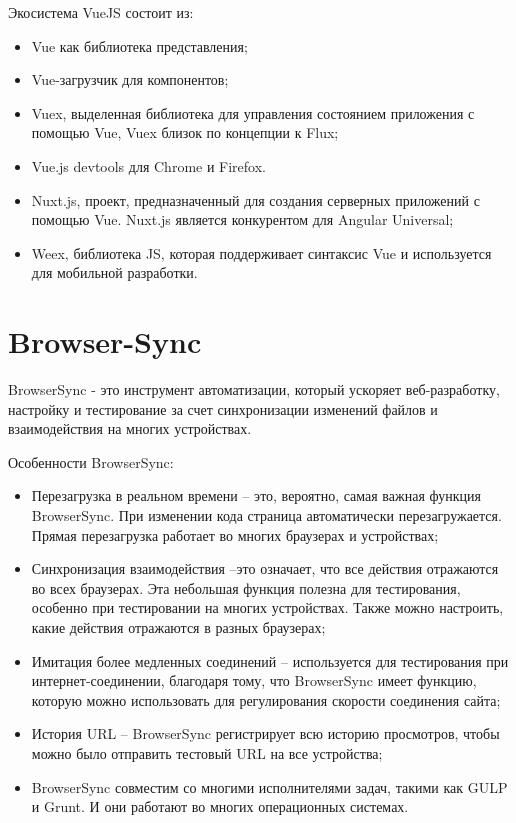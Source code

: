 Экосистема VueJS состоит из:

\begin{itemize}
	\item Vue как библиотека представления;
	\item Vue-загрузчик для компонентов;
	\item Vuex, выделенная библиотека для управления состоянием приложения с помощью Vue, Vuex близок по концепции к Flux;
	\item Vue.js devtools для Chrome и Firefox.
	\item Nuxt.js, проект, предназначенный для создания серверных приложений с помощью Vue. Nuxt.js является  конкурентом для Angular Universal;
	\item Weex, библиотека JS, которая поддерживает синтаксис Vue и используется для мобильной разработки.
\end{itemize}

\section{Browser-Sync}

BrowserSync - это инструмент автоматизации, который ускоряет веб-разработку, настройку и тестирование за счет синхронизации изменений файлов и взаимодействия на многих устройствах.

Особенности BrowserSync:

\begin{itemize}
\item Перезагрузка в реальном времени – это, вероятно, самая важная функция BrowserSync. При изменении кода страница автоматически перезагружается. Прямая перезагрузка работает во многих браузерах и устройствах;
\item Синхронизация взаимодействия –это означает, что все действия отражаются во всех браузерах. Эта небольшая функция полезна для тестирования, особенно при тестировании на многих устройствах. Также можно настроить, какие действия отражаются в разных браузерах;
\item Имитация более медленных соединений – используется для тестирования при интернет-соединении, благодаря тому, что BrowserSync имеет функцию, которую можно использовать для регулирования скорости соединения сайта;
\item История URL – BrowserSync регистрирует всю историю просмотров, чтобы можно было отправить тестовый URL на все устройства;
\item BrowserSync совместим со многими исполнителями задач, такими как GULP и Grunt. И они работают во многих операционных системах.
\end{itemize}

